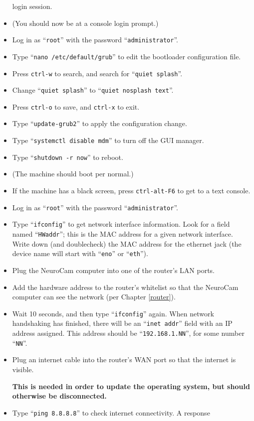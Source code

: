 \begin{itemize}
login session.
\item (You should now be at a console login prompt.)
\item Log in as ``\verb+root+'' with the password ``\verb+administrator+''.
\item Type ``\verb+nano /etc/default/grub+'' to edit the bootloader
configuration file.
\item Press \verb+ctrl-w+ to search, and search for ``\verb+quiet splash+''.
\item Change ``\verb+quiet splash+'' to ``\verb+quiet nosplash text+''.
\item Press \verb+ctrl-o+ to save, and \verb+ctrl-x+ to exit.
\item Type ``\verb+update-grub2+'' to apply the configuration change.
\item Type ``\verb+systemctl disable mdm+'' to turn off the GUI manager.
\item Type ``\verb+shutdown -r now+'' to reboot.
%
\item (The machine should boot per normal.)
\item If the machine has a black screen, press \verb+ctrl-alt-F6+ to get
to a text console.
\item Log in as ``\verb+root+'' with the password ``\verb+administrator+''.
\item Type ``\verb+ifconfig+'' to get network interface information. Look
for a field named ``\verb+HWaddr+''; this is the MAC address for a given
network interface. Write down (and doublecheck) the MAC address for the
ethernet jack (the device name will start with ``\verb+eno+'' or
``\verb+eth+'').
\item Plug the NeuroCam computer into one of the router's LAN ports.
\item Add the hardware address to the router's whitelist so that the
NeuroCam computer can see the network (per Chapter \ref{router}).
\item Wait 10 seconds, and then type ``\verb+ifconfig+'' again. When network
handshaking has finished, there will be an ``\verb+inet addr+'' field with
an IP address assigned. This address should be ``\verb+192.168.1.NN+'', for
some number ``\verb+NN+''.
\item Plug an internet cable into the router's WAN port so that the internet
is visible.
\par
\textbf{This is needed in order to update the operating system, but should
otherwise be disconnected.}
\item Type ``\verb+ping 8.8.8.8+'' to check internet connectivity. A response

\end{itemize}
